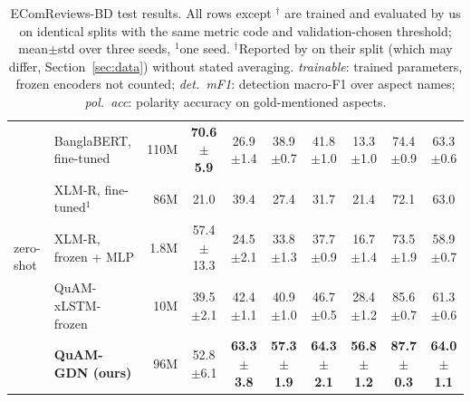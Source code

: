 \documentclass[11pt]{article}
\newcommand{\pmstd}[2]{#1{\scriptsize$\pm$#2}}
\newcommand{\quam}{QuAM-GDN}
\begin{document}
\begin{table}[p]
\begin{tabular}{llrccccccc}
\midrule
\multirow{5}{*}{zero-shot}
 & BanglaBERT, fine-tuned               & 110M & \textbf{\pmstd{70.6}{5.9}} & \pmstd{26.9}{1.4} & \pmstd{38.9}{0.7} & \pmstd{41.8}{1.0} & \pmstd{13.3}{1.0} & \pmstd{74.4}{0.9} & \pmstd{63.3}{0.6} \\
 & XLM-R, fine-tuned$^1$                & 86M  & 21.0 & 39.4 & 27.4 & 31.7 & 21.4 & 72.1 & 63.0 \\
 & XLM-R, frozen + MLP                  & 1.8M & \pmstd{57.4}{13.3} & \pmstd{24.5}{2.1} & \pmstd{33.8}{1.3} & \pmstd{37.7}{0.9} & \pmstd{16.7}{1.4} & \pmstd{73.5}{1.9} & \pmstd{58.9}{0.7} \\
 & QuAM-xLSTM-frozen                    & 10M  & \pmstd{39.5}{2.1} & \pmstd{42.4}{1.1} & \pmstd{40.9}{1.0} & \pmstd{46.7}{0.5} & \pmstd{28.4}{1.2} & \pmstd{85.6}{0.7} & \pmstd{61.3}{0.6} \\
 & \textbf{\quam{} (ours)}              & 96M  & \pmstd{52.8}{6.1} & \textbf{\pmstd{63.3}{3.8}} & \textbf{\pmstd{57.3}{1.9}} & \textbf{\pmstd{64.3}{2.1}} & \textbf{\pmstd{56.8}{1.2}} & \textbf{\pmstd{87.7}{0.3}} & \textbf{\pmstd{64.0}{1.1}} \\
\bottomrule
\end{tabular}
\caption{EComReviews-BD test results. All rows except $^\dagger$ are trained and evaluated by us on
identical splits with the same metric code and validation-chosen threshold; mean$\pm$std over three
seeds, $^1$one seed. $^\dagger$Reported by \citet{haque2026ecomreviews} on their split (which may
differ, Section~\ref{sec:data}) without stated averaging. \emph{trainable}: trained parameters, frozen
encoders not counted; \emph{det.\ mF1}: detection macro-F1 over aspect names; \emph{pol.\ acc}:
polarity accuracy on gold-mentioned aspects.}
\label{tab:main}
\end{table}
\end{document}

